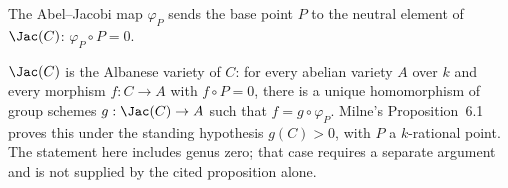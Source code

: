 \begin{lemma}
  \label{lem:comp_ofCurve}
  The Abel--Jacobi map \(\varphi_P\) sends the base point \(P\) to the neutral element of
  \(\Jac(C)\): \(\varphi_P \circ P = 0\).
\end{lemma}

\begin{theorem}
  \label{thm:exists_unique_ofCurve_comp}
  \(\Jac(C)\) is the Albanese variety of \(C\): for every abelian variety \(A\) over \(k\) and every
  morphism \(f : C \to A\) with \(f \circ P = 0\), there is a unique homomorphism of group schemes
  \(g : \Jac(C) \to A\) such that \(f = g \circ \varphi_P\).  Milne's Proposition~6.1
  proves this under the standing hypothesis \(g(C)>0\), with \(P\) a \(k\)-rational point.
  The statement here includes genus zero; that case requires a separate argument and is not
  supplied by the cited proposition alone.
\end{theorem}
